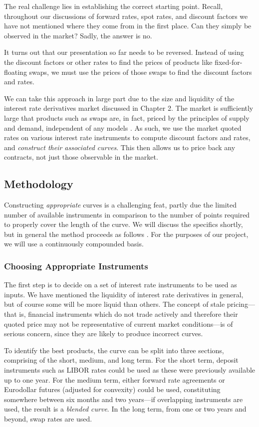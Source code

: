 The real challenge lies in establishing the correct starting point. Recall, throughout our discussions of forward rates, spot rates, and discount factors we have not mentioned where they come from in the first place. Can they simply be observed in the market? Sadly, the answer is no. 

It turns out that our presentation so far needs to be reversed. Instead of using the discount factors or other rates to find the prices of products like fixed-for-floating swaps, we must use the prices of those swaps to find the discount factors and rates. 

We can take this approach in large part due to the size and liquidity of the interest rate derivatives market discussed in Chapter 2. The market is sufficiently large that products such as swaps are, in fact, priced by the principles of supply and demand, independent of any models \citep{wilmott2013paul}. As such, we use the market quoted rates on various interest rate instruments to compute discount factors and rates, and \textit{construct their associated curves}. This then allows us to price back any contracts, not just those observable in the market. 

\subsection{Methodology}
Constructing \textit{appropriate} curves is a challenging feat, partly due the limited number of available instruments in comparison to the number of points required to properly cover the length of the curve. We will discuss the specifics shortly, but in general the method proceeds as follows \citep{banque_canada}. For the purposes of our project, we will use a continuously compounded basis.

\subsubsection{Choosing Appropriate Instruments}
The first step is to decide on a set of interest rate instruments to be used as inputs. We have mentioned the liquidity of interest rate derivatives in general, but of course some will be more liquid than others. The concept of stale pricing––that is, financial instruments which do not trade actively and therefore their quoted price may not be representative of current market conditions––is of serious concern, since they are likely to produce incorrect curves. 

To identify the best products, the curve can be split into three sections, comprising of the short, medium, and long term. For the short term, deposit instruments such as LIBOR rates could be used as these were previously available up to one year. For the medium term, either forward rate agreements or Eurodollar futures (adjusted for convexity) could be used, constituting somewhere between six months and two years––if overlapping instruments are used, the result is a \textit{blended curve}. In the long term, from one or two years and beyond, swap rates are used. 

